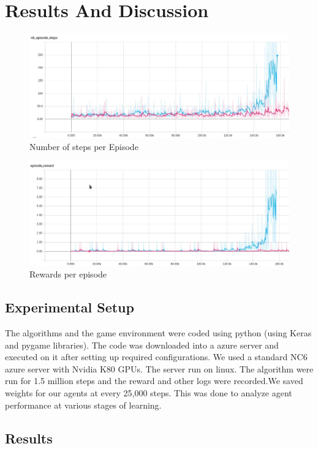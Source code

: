 \documentclass[conference,10pt]{IEEEtran}
\begin{document}
	\section{Results And Discussion}
	\begin{figure}[]

		\includegraphics[scale=0.23]{ep_step.jpeg}
		\caption{Number of steps per Episode}
		\label{step}

	\end{figure}
	\begin{figure}[]

		\includegraphics[scale=0.23]{ep_reward.jpeg}
		\caption{Rewards per episode}
		\label{reward}

	\end{figure}
	\subsection{Experimental Setup}
	The algorithms and the game environment were coded using python (using Keras and pygame libraries). The code was downloaded into a azure server and executed on it after setting up required configurations. We used a standard NC6 azure server with Nvidia K80 GPUs. The server run on linux.
	\break
	\break
	The algorithm were run for 1.5 million steps and the reward and other logs were recorded.We saved weights for our agents at every 25,000 steps. This was done to analyze agent performance at various stages of learning.
	\subsection{Results}
\end{document}
